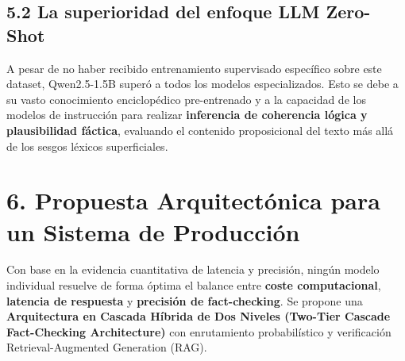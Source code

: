 \subsection*{5.2 La superioridad del enfoque LLM Zero-Shot}

A pesar de no haber recibido entrenamiento supervisado específico sobre este dataset, Qwen2.5-1.5B superó a todos los modelos especializados. Esto se debe a su vasto conocimiento enciclopédico pre-entrenado y a la capacidad de los modelos de instrucción para realizar \textbf{inferencia de coherencia lógica y plausibilidad fáctica}, evaluando el contenido proposicional del texto más allá de los sesgos léxicos superficiales.


\section*{6. Propuesta Arquitectónica para un Sistema de Producción}

Con base en la evidencia cuantitativa de latencia y precisión, ningún modelo individual resuelve de forma óptima el balance entre \textbf{coste computacional}, \textbf{latencia de respuesta} y \textbf{precisión de fact-checking}. Se propone una \textbf{Arquitectura en Cascada Híbrida de Dos Niveles (Two-Tier Cascade Fact-Checking Architecture)} con enrutamiento probabilístico y verificación Retrieval-Augmented Generation (RAG).


